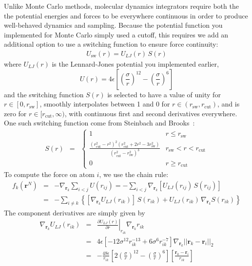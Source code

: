 \documentclass[aip,jcp,preprint,superscriptaddress,floatfix]{revtex4-1}
\begin{document}
Unlike Monte Carlo methods, molecular dynamics integrators require both the the potential energies and forces to be everywhere continuous in order to produce well-behaved dynamics and sampling.
Because the potential function you implemented for Monte Carlo simply used a cutoff, this requires we add an additional option to use a switching function to ensure force continuity:
\begin{eqnarray}
U_\mathrm{sw}(r) = U_{LJ}(r) \, S(r)
\end{eqnarray}
where $U_{LJ}(r)$ is the Lennard-Jones potential you implemented earlier, 
\begin{equation}
U(r) = 4 \epsilon \left[\left(\frac{\sigma}{r}\right)^{12} -\left(\frac{\sigma}{r}\right)^{6} \right] 
\end{equation}
and the switching function $S(r)$ is selected to have a value of unity for $r \in [0, r_\mathrm{sw}]$, smoothly interpolates between 1 and 0 for $r \in (r_\mathrm{sw}, r_\mathrm{cut})$, and is zero for $r \in [r_\mathrm{cut}, \infty)$, with continuous first and second derivatives everywhere.
One such switching function come from Steinbach and Brooks~\cite{SwitchingFunction,Shirts.JCP.119.5740.2003}:
\begin{eqnarray}
S(r) &=& \begin{cases}
1 & r \le r_\mathrm{sw} \\
\frac{(r_\mathrm{cut}^2 - r^2)^2 (r_\mathrm{cut}^2 + 2 r^2 - 3 r_\mathrm{sw}^2)}{(r_\mathrm{cut}^2 - r_\mathrm{sw}^2)^3} & r_\mathrm{sw} < r < r_\mathrm{cut} \\
0 & r \ge r_\mathrm{cut}
\end{cases}
\end{eqnarray}
To compute the force on atom $i$, we use the chain rule:
\begin{eqnarray}
f_k(\textbf{r}^N) &=& - \nabla_{\textbf{r}_k} \sum_{i < j} U(r_{ij}) =  - \sum_{i < j} \nabla_{\textbf{r}_k} \left[ U_{LJ}(r_{ij}) \, S(r_{ij}) \right] \nonumber \\
&=& - \sum_{i \ne k} \left\{ [ \nabla_{\textbf{r}_k} U_{LJ}(r_{ik}) ] \, S(r_{ik}) + U_{LJ}(r_{ik}) \,  \nabla_{\textbf{r}_k} S(r_{ik}) \right\}
\end{eqnarray}
The component derivatives are simply given by
\begin{eqnarray}
\nabla_{\mathbf{r}_k} U_{LJ}(r_{ik}) &=& \left. \frac{\partial U_{LJ}(r)}{\partial r} \right|_{r_{ik}} \nabla_{\mathbf{r}_k} r_{ik}  \\
&=& 4 \epsilon \left[- 12 \sigma^{12} r_{ik}^{-13} + 6 \sigma^6 r_{ik}^{-7} \right] \nabla_{\mathbf{r}_k} || \mathbf{r}_k - \mathbf{r}_i ||_2  \\
&=& - \frac{48 \epsilon}{r_{ik}} \left[2 \left(\frac{\sigma}{r}\right)^{12} - \left(\frac{\sigma}{r}\right)^{6} \right] \left[ \frac{\mathbf{r}_k - \mathbf{r}_i}{r_{ik}} \right]
\end{eqnarray}
\end{document}
